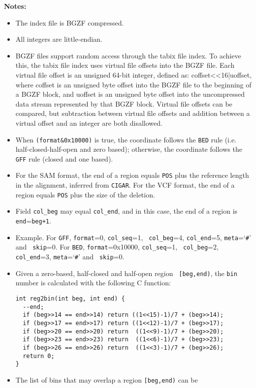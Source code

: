 \documentclass[10pt]{article}
\begin{document}
{\bf Notes:}

\begin{itemize}
\item The index file is BGZF compressed.
\item All integers are little-endian.
\item BGZF files support random access through the tabix file index.
To achieve this, the tabix file index uses virtual file offsets into the
BGZF file. Each virtual file offset is an unsigned 64-bit integer, defined
as: coffset<<16|uoffset, where coffset is an unsigned byte offset into
the BGZF file to the beginning of a BGZF block, and uoffset is an
unsigned byte offset into the uncompressed data stream represented
by that BGZF block. Virtual file offsets can be compared, but
subtraction between virtual file offsets and addition between a virtual
offset and an integer are both disallowed.
\item When {\tt (format\&0x10000)} is true, the coordinate follows the
  {\tt BED} rule (i.e. half-closed-half-open and zero based); otherwise,
  the coordinate follows the {\tt GFF} rule (closed and one based).
\item For the SAM format, the end of a region equals {\tt POS} plus the
  reference length in the alignment, inferred from {\tt CIGAR}. For the
  VCF format, the end of a region equals {\tt POS} plus the size of the
  deletion.
\item Field {\tt col\_beg} may equal {\tt col\_end}, and in this case,
  the end of a region is {\tt end}={\tt beg+1}.
\item Example. For {\tt GFF}, {\tt format}=0, {\tt col\_seq}=1, {\tt
    col\_beg}=4, {\tt col\_end}=5, {\tt meta}=`{\tt \#}' and {\tt
    skip}=0. For {\tt BED}, {\tt format}=0x10000, {\tt col\_seq}=1, {\tt
    col\_beg}=2, {\tt col\_end}=3, {\tt meta}=`{\tt \#}' and {\tt
    skip}=0.
\item Given a zero-based, half-closed and half-open region {\tt
    [beg,end)}, the {\tt bin} number is calculated with the following C
  function:
\begin{verbatim}
int reg2bin(int beg, int end) {
  --end;
  if (beg>>14 == end>>14) return ((1<<15)-1)/7 + (beg>>14);
  if (beg>>17 == end>>17) return ((1<<12)-1)/7 + (beg>>17);
  if (beg>>20 == end>>20) return  ((1<<9)-1)/7 + (beg>>20);
  if (beg>>23 == end>>23) return  ((1<<6)-1)/7 + (beg>>23);
  if (beg>>26 == end>>26) return  ((1<<3)-1)/7 + (beg>>26);
  return 0;
}
\end{verbatim}
\item The list of bins that may overlap a region {\tt [beg,end)} can be

\end{itemize}
\end{document}
